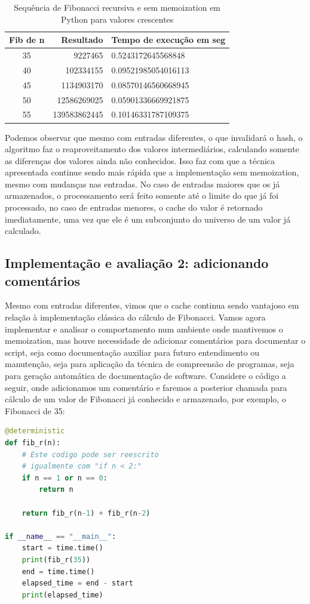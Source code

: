\documentclass[sigconf]{acmart}
\begin{document}
\begin{table}[H]
  \caption{Sequência de Fibonacci recursiva e sem memoization em Python para valores crescentes}
  \label{tab:fibrccache2}
  \begin{tabular}{crl}
    \toprule
    Fib de n & Resultado & Tempo de execução em seg\\
    \midrule
    35 & 9227465 & 0.5243172645568848\\
    40 & 102334155 & 0.09521985054016113\\
    45 & 1134903170 & 0.08570146560668945\\
    50 & 12586269025 & 0.05901336669921875\\
    55 & 139583862445 & 0.10146331787109375\\
  \bottomrule
\end{tabular}
\end{table}

Podemos observar que mesmo com entradas diferentes, o que invalidará o hash, o algoritmo faz o reaproveitamento dos valores intermediários, calculando somente as diferenças dos valores ainda não conhecidos. Isso faz com que a técnica apresentada continue sendo mais rápida que a implementação sem memoization, mesmo com mudanças nas entradas. No caso de entradas maiores que os já armazenados, o processamento será feito somente até o limite do que já foi processado, no caso de entradas menores, o cache do valor é retornado imediatamente, uma vez que ele é um subconjunto do universo de um valor já calculado.
 
\subsection{Implementação e avaliação 2: adicionando comentários}
Mesmo com entradas diferentes, vimos que o cache continua sendo vantajoso em relação à implementação clássica do cálculo de Fibonacci. Vamos agora implementar e analisar o comportamento num ambiente onde mantivemos o memoization, mas houve necessidade de adicionar comentários para documentar o script, seja como documentação auxiliar para futuro entendimento ou manutenção, seja para aplicação da técnica de compreensão de programas, seja para geração automática de documentação de software. Considere o código a seguir, onde adicionamos um comentário e faremos a posterior chamada para cálculo de um valor de Fibonacci já conhecido e armazenado, por exemplo, o Fibonacci de 35:

\renewcommand{\lstlistingname}{Trecho de código}
\begin{lstlisting}[language=Python, caption=Sequência de Fibonacci recursiva sem memoization]
@deterministic
def fib_r(n):
    # Este codigo pode ser reescrito
    # igualmente com "if n < 2:"
    if n == 1 or n == 0:
        return n

    return fib_r(n-1) + fib_r(n-2)

if __name__ == "__main__":
    start = time.time()
    print(fib_r(35))
    end = time.time()
    elapsed_time = end - start
    print(elapsed_time)
\end{lstlisting}
\end{document}
